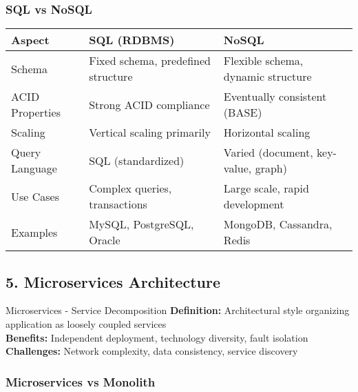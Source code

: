 \documentclass[10pt,a4paper]{article}
\begin{document}
\subsubsection{SQL vs NoSQL}

\begin{table}[h]
\centering
\begin{tabular}{|p{3cm}|p{5cm}|p{5cm}|}
\hline
\textbf{Aspect} & \textbf{SQL (RDBMS)} & \textbf{NoSQL} \\
\hline
Schema & Fixed schema, predefined structure & Flexible schema, dynamic structure \\
\hline
ACID Properties & Strong ACID compliance & Eventually consistent (BASE) \\
\hline
Scaling & Vertical scaling primarily & Horizontal scaling \\
\hline
Query Language & SQL (standardized) & Varied (document, key-value, graph) \\
\hline
Use Cases & Complex queries, transactions & Large scale, rapid development \\
\hline
Examples & MySQL, PostgreSQL, Oracle & MongoDB, Cassandra, Redis \\
\hline
\end{tabular}
\end{table}

\subsection{5. Microservices Architecture}

\begin{conceptbox}{Microservices - Service Decomposition}
\textbf{Definition:} Architectural style organizing application as loosely coupled services\\
\textbf{Benefits:} Independent deployment, technology diversity, fault isolation\\
\textbf{Challenges:} Network complexity, data consistency, service discovery
\end{conceptbox}

\subsubsection{Microservices vs Monolith}
\end{document}
